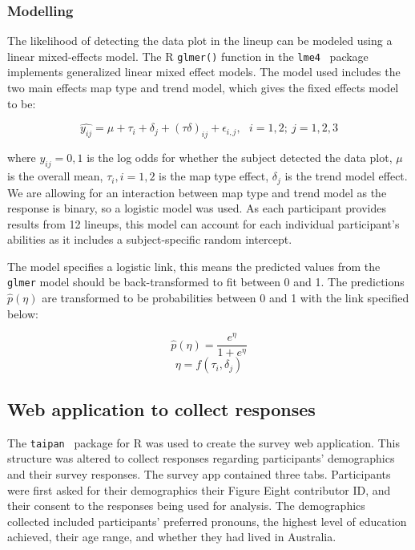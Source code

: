 \documentclass[journal]{vgtc}                     %
\begin{document}
\hypertarget{modelling}{%
\subsubsection{Modelling}\label{modelling}}

The likelihood of detecting the data plot in the lineup can be modeled using a linear mixed-effects model.
The R \cite{RCore} \texttt{glmer()} function in the \texttt{lme4}~\cite{lme4} package implements generalized linear mixed effect models. The model used includes the two main effects map type and trend model, which gives the fixed effects model to be:

\[\widehat{y_{ij}} = \mu + \tau_i + \delta_j + (\tau\delta)_{ij} + \epsilon_{i,j}, ~~~ i=1,2; ~j=1,2,3\]

\noindent where \(y_{ij} = 0, 1\) is the log odds for whether the subject detected the data plot, \(\mu\) is the overall mean, \(\tau_i, i=1,2\) is the map type effect, \(\delta_j\) is the trend model effect. We are allowing for an interaction between map type and trend model as the response is binary, so a logistic model was used. As each participant provides results from 12 lineups, this model can account for each individual participant's abilities as it includes a subject-specific random intercept.

The model specifies a logistic link, this means the predicted values from the \texttt{glmer} model should be back-transformed to fit between 0 and 1. The predictions \(\widehat{p}(\eta)\) are transformed to be probabilities between 0 and 1 with the link specified below:

\[\widehat{p}(\eta) = \frac{e^{\eta}}{1 + e^{\eta}}\] \label{eq:transform}
\[\eta = f(\tau_i,\delta_j)\]

\hypertarget{web-application-to-collect-responses}{%
\subsection{Web application to collect responses}\label{web-application-to-collect-responses}}

The \texttt{taipan}~\cite{taipan} package for R was used to create the survey web application.
This structure was altered to collect responses regarding participants' demographics and their survey responses.
The survey app contained three tabs. Participants were first asked for their demographics their Figure Eight contributor ID, and their consent to the responses being used for analysis. The demographics collected included participants' preferred pronouns, the highest level of education achieved, their age range, and whether they had lived in Australia.
\end{document}
